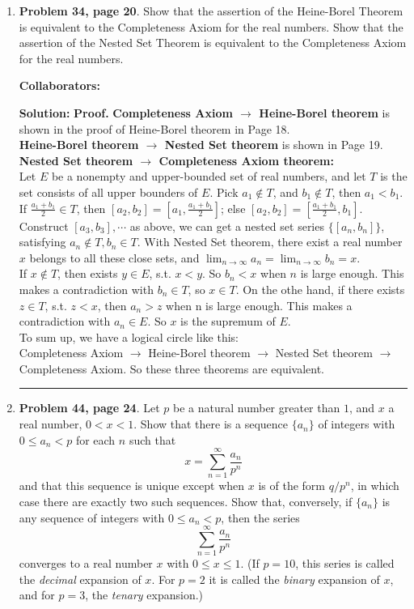 \documentclass{article}%
\newenvironment{proof}[1][Proof]{\textbf{#1.} }{\ \rule{0.5em}{0.5em}}
\begin{document}
\begin{enumerate}
\item \textbf{Problem 34, page 20}.  Show that the assertion of the Heine-Borel Theorem is equivalent to the Completeness Axiom for the real numbers.  Show that the assertion of the Nested Set Theorem is equivalent to the Completeness Axiom for the real numbers.

\bigskip
\textbf{Collaborators:}\\
\smallskip
 
\textbf{Solution:}
\begin{proof}
\textbf{Completeness Axiom $\to$ Heine-Borel theorem} is shown in the proof of Heine-Borel theorem in Page 18.
\\
\textbf{Heine-Borel theorem $\to$ Nested Set theorem} is shown in Page 19. \\
\textbf{Nested Set theorem $\to$ Completeness Axiom theorem:}\\
Let $E$ be a nonempty and upper-bounded set of real numbers, and let $T$ is the set consists of all upper bounders of $E$. Pick $a_1\notin T$, and $b_1 \notin T$, then $a_1 < b_1$.
If $\frac{a_1+b_1}{2} \in T$, then $[a_2, b_2] = \left[a_1, \frac{a_1+b_1}{2}\right]$; else $[a_2, b_2] = \left[\frac{a_1+b_1}{2}, b_1\right]$. 
Construct $[a_3, b_3], \cdots$ as above, we can get a nested set series $\{[a_n, b_n]\}$, satisfying $a_n\notin T, b_n\in T$. With Nested Set theorem, there exist a real number $x$ belongs to all these close sets, and $\lim_{n\to\infty}a_n = \lim_{n\to\infty}b_n = x$.\\
If $x\notin T$, then exists $y\in E$, s.t. $x < y$. So $b_n < x$ when $n$ is large enough. This makes a contradiction with $b_n\in T$, so $x\in T$. On the othe hand, if there exists $z\in T$, s.t. $z < x$, then $a_n > z$ when n is large enough. This makes a contradiction with $a_n\in E$. So $x$ is the supremum of $E$.
\\
To sum up, we have a logical circle like this: \\
Completeness Axiom $\to$ Heine-Borel theorem $\to$ Nested Set theorem $\to$ Completeness Axiom. So these three theorems are equivalent.
\end{proof}

\bigskip

\item \textbf{Problem 44, page 24}.  Let $p$ be a natural number greater than $1$, and $x$ a real number, $0<x<1$.  Show that there is a sequence $\{a_n\}$ of integers with $0\leq a_n < p$ for each $n$ such that \[
x = \sum_{n=1}^{\infty} \frac{a_n}{p^n} \]and that this sequence is unique except when $x$ is of the form $q/p^n$, in which case there are exactly two such sequences.  Show that, conversely, if $\{a_n\}$ is any sequence of integers with $0\leq a_n < p$, then the series \[\sum_{n=1}^{\infty} \frac{a_n}{p^n} \]converges to a real number $x$ with $0\leq x \leq 1$. (If $p = 10$, this series is called the \emph{decimal} expansion of $x$.  For $p = 2$ it is called the \emph{binary} expansion of $x$, and for $p = 3$, the \emph{tenary} expansion.) 



\end{enumerate}
\end{document}
